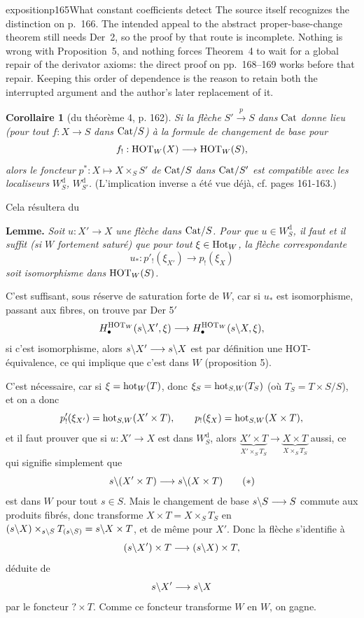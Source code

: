 \begin{dcomment}{exposition}{p165}{What constant coefficients detect}
The source itself recognizes the distinction on p.~166. The intended appeal to the abstract proper-base-change theorem still needs Der~2, so the proof by that route is incomplete. Nothing is wrong with Proposition~5, and nothing forces Theorem~4 to wait for a global repair of the derivator axioms: the direct proof on pp.~168--169 works before that repair. Keeping this order of dependence is the reason to retain both the interrupted argument and the author's later replacement of it.
\end{dcomment}


\noindent{}%
\textbf{Corollaire 1} (du théorème 4, p. 162). \textit{Si la flèche} $S' \xrightarrow{p} S$ \textit{dans} $\mathrm{Cat}$ \textit{donne lieu (pour tout} $f : X \longrightarrow S$ \textit{dans} $\mathrm{Cat}/S$\textit{) à la formule de changement de base pour}
\[
f_! : \mathrm{HOT}_W(X) \longrightarrow \mathrm{HOT}_W(S),
\]
\textit{alors le foncteur} $p^* : X \longmapsto X \times_S S'$ \textit{de} $\mathrm{Cat}/S$ \textit{dans} $\mathrm{Cat}/S'$ \textit{est compatible avec les localiseurs} $W^{\mathrm{d}}_{S}$\textit{,} $W^{\mathrm{d}}_{S'}$\textit{.} (L'implication inverse a été vue déjà, cf. pages 161-163.)

Cela résultera du

\noindent\textbf{Lemme.} \textit{Soit} $u : X' \longrightarrow X$ \textit{une flèche dans} $\mathrm{Cat}/S$\textit{. Pour que} $u \in W^{\mathrm{d}}_{S}$\textit{, il faut et il suffit (si $W$} \textit{fortement saturé) que pour tout} $\xi \in \mathrm{Hot}_W$\textit{, la flèche correspondante}
\[
u_* : p'_!(\xi_{X'}) \longrightarrow p_!(\xi_X)
\]
\textit{soit} \textit{isomorphisme dans} $\mathrm{HOT}_W(S)$\textit{.}

C'est suffisant, sous réserve de saturation forte de $W$, car si $u_*$ est isomorphisme, passant aux fibres, on trouve par Der 5$'$
\[
H_\bullet^{\mathrm{HOT}_W}(s\backslash X', \xi) \longrightarrow H_\bullet^{\mathrm{HOT}_W}(s\backslash X, \xi),
\]
si c'est isomorphisme, alors $s\backslash X' \longrightarrow s\backslash X$ est par définition une HOT-équivalence, ce qui implique que c'est dans $W$ (proposition 5).

C'est nécessaire, car si $\xi = \mathrm{hot}_W(T)$, donc $\xi_S = \mathrm{hot}_{S,W}(T_S)$ (où $T_S = T \times S/S$), et on a donc
\[
p'_!(\xi_{X'}) = \mathrm{hot}_{S,W}(X' \times T), \qquad p_!(\xi_X) = \mathrm{hot}_{S,W}(X \times T),
\]
et il faut prouver que si $u : X' \longrightarrow X$ est dans $W^{\mathrm{d}}_{S}$, alors $\underbrace{X' \times T}_{X' \times_S T_S} \longrightarrow \underbrace{X \times T}_{X \times_S T_S}$ aussi, ce qui signifie simplement que
\[
s\backslash(X' \times T) \longrightarrow s\backslash(X \times T) \tag*{$(*)$}
\]
est dans $W$ pour tout $s \in S$. Mais le changement de base $s\backslash S \longrightarrow S$ commute aux produits fibrés, donc transforme $X \times T = X \times_S T_S$ en $(s\backslash X) \times_{s\backslash S} T_{(s\backslash S)} = s\backslash X \times T$, et de même pour $X'$. Donc la flèche s'identifie à
\[
(s\backslash X') \times T \longrightarrow (s\backslash X) \times T,
\]
déduite de
\[
s\backslash X' \longrightarrow s\backslash X
\]
par le foncteur $? \times T$. Comme ce foncteur transforme $W$ en $W$, on gagne.

